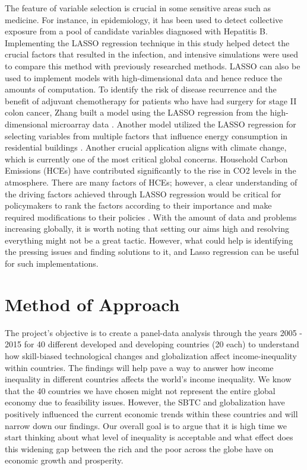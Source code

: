 \documentclass[12pt,oneside]{book} %
\begin{document}
The feature of variable selection is crucial in some sensitive areas such as medicine. For instance, in epidemiology, it has been used to detect collective exposure from a pool of candidate variables diagnosed with Hepatitis B. Implementing the LASSO regression technique in this study helped detect the crucial factors that resulted in the infection, and intensive simulations were used to compare this method with previously researched methods\cite{guo2015improved}. LASSO can also be used to implement models with high-dimensional data and hence reduce the amounts of computation. To identify the risk of disease recurrence and the benefit of adjuvant chemotherapy for patients who have had surgery for stage II colon cancer, Zhang built a model using the LASSO regression from the high-dimensional microarray data \cite{zhang2013prognostic}. Another model utilized the LASSO regression for selecting variables from multiple factors that influence energy consumption in residential buildings \cite{satre2019investigating}. Another crucial application aligns with climate change, which is currently one of the most critical global concerns. Household Carbon Emissions (HCEs) have contributed significantly to the rise in CO2 levels in the atmosphere. There are many factors of HCEs; however, a clear understanding of the driving factors achieved through LASSO regression would be critical for policymakers to rank the factors according to their importance and make required modifications to their policies \cite{shi2020prioritizing}. With the amount of data and problems increasing globally, it is worth noting that setting our aims high and resolving everything might not be a great tactic. However, what could help is identifying the pressing issues and finding solutions to it, and Lasso regression can be useful for such implementations.


\section{Method of Approach}
\label{sec:method}

\hspace{20pt}The project's objective is to create a panel-data analysis through the years 2005 - 2015 for 40 different developed and developing countries (20 each) to understand how skill-biased technological changes and globalization affect income-inequality within countries. The findings will help pave a way to answer how income inequality in different countries affects the world's income inequality. We know that the 40 countries we have chosen might not represent the entire global economy due to feasibility issues. However, the SBTC and globalization have positively influenced the current economic trends within these countries and will narrow down our findings. Our overall goal is to argue that it is high time we start thinking about what level of inequality is acceptable and what effect does this widening gap between the rich and the poor across the globe have on economic growth and prosperity. 
\end{document}

